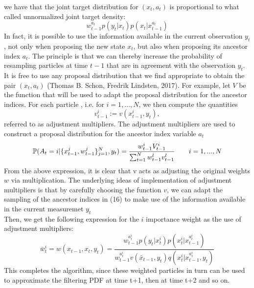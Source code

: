 \documentclass[11pt,oneside,a4paper]{article}
\begin{document}
we have that the joint target distribution for $(x_{t}, a_{t}) $ is proportional to what called unnormalized joint target density:
\begin{equation}
w_{t-1}^{a_{t}}p(y_{t}|x_{t})p(x_{t}|x_{t-1}^{a_{t}})
\end{equation}
In fact, it is possible to use the information available in the current observation $y_{t} $, not only when proposing the new state $x_{t} $, but also when proposing its ancestor index $a_{t} $. The principle is that we can thereby increase the probability of resampling particles at time $t-1 $ that are in
agreement with the observation $y_{t} $. \\
It is free to use any proposal distribution that we find appropriate to obtain the pair $(x_{t}, a_{t}) $ (Thomas B. Schon, Fredrik Lindsten, 2017). For example, let $V $ be the function that will be used to adapt the proposal distribution for the ancestor indices. For each particle
, i.e. for $i = 1,...,N $, we then compute the quantities
\begin{equation}
  v_{t-1}^{i} := v(x_{t-1}^{i}, y_{t}),
\end{equation}
referred to as adjustment multipliers. The adjustment multipliers are used to construct a proposal distribution for the ancestor index variable $a_{t} $
\begin{equation}
\mathbb{P} (A_{t} = i \arrowvert \{ x_{t-1}^{j}, w_{t-1}^{j} \}_{j=1}^{N} , y_{t} ) = \frac{w_{t-1}^{i} V_{t-1}^{i}}{\sum_{t=1}^{N} w_{t-1}^{l} v_{t-1}^{l}} \qquad i = 1,...,N
\end{equation}
From the above expression, it is clear that v acts as adjusting the original weights $w $ via multiplication. The underlying ideas of implementation of adjustment multipliers is that by carefully choosing the function $v $, we can adapt the sampling of the ancestor
indices in (16) to make use of the information available in the current measuremet $y_{t} $ \\
Then, we get the following expression for the $i $ importance weight as the use of adjustment multipliers:
\begin{equation}
\bar{w}_{t}^{i} = w(x_{t-1}, x_{t}, y_{t}) = \frac{w_{t-1}^{a_{t}^{i}} p(y_{t}|x_{t}^{i}) p(x_{t}^{i}|x_{t-1}^{a_{t}^{i}})}{w_{t-1}^{a_{t}^{i}} v(\bar{x}_{t-1}, y_{t}) q(x_{t}^{i}|x_{t-1}^{a_{t}^{i}}, y_{t})}
\end{equation}
This completes the algorithm, since these weighted particles in turn can be used to approximate the filtering PDF at
time t+1, then at time t+2 and so on.
\end{document}
